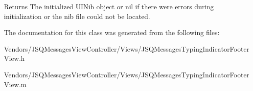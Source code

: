 \begin{DoxyReturn}{Returns}
The initialized {\ttfamily U\+I\+Nib} object or {\ttfamily nil} if there were errors during initialization or the nib file could not be located. 
\end{DoxyReturn}


The documentation for this class was generated from the following files\+:\begin{DoxyCompactItemize}
\item 
Vendors/\+J\+S\+Q\+Messages\+View\+Controller/\+Views/J\+S\+Q\+Messages\+Typing\+Indicator\+Footer\+View.\+h\item 
Vendors/\+J\+S\+Q\+Messages\+View\+Controller/\+Views/J\+S\+Q\+Messages\+Typing\+Indicator\+Footer\+View.\+m\end{DoxyCompactItemize}
